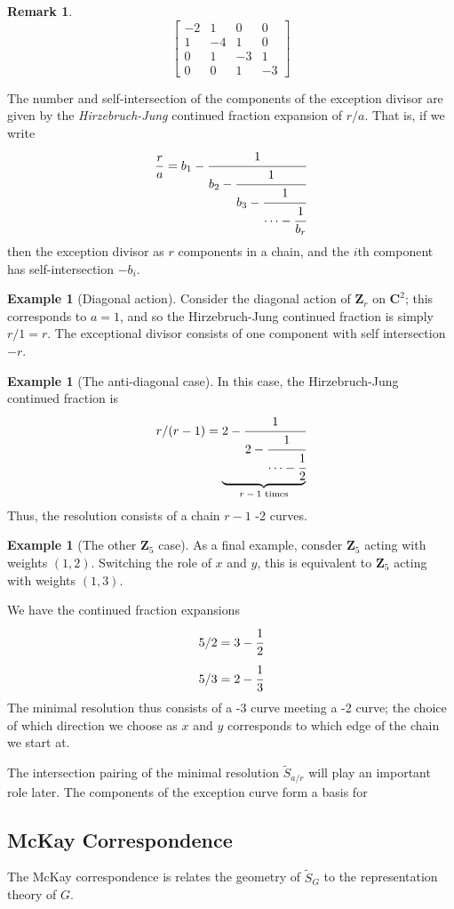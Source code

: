 \documentclass{amsart}[12pt]
\theoremstyle{definition}
\newtheorem{example}[dummy]{Example}
\newtheorem{remark}[dummy]{Remark}
\newcommand{\Z}{\mathbf{Z}}
\newcommand{\C}{\mathbf{C}}
\begin{document}
\begin{remark}
$$
\begin{bmatrix}
-2 & 1 & 0 & 0 \\
1 & -4 & 1 & 0 \\
0 & 1 & -3 & 1 \\
0 & 0 & 1 & -3 
\end{bmatrix}
$$

The number and self-intersection of the components of the exception divisor are given by the \emph{Hirzebruch-Jung} continued fraction expansion of $r/a$.  That is, if we write
$$
\frac{r}{a}=b_1-\cfrac{1}{b_2-\cfrac{1}{b_3-\cfrac{1}{\cdots - \cfrac{1}{b_r}}}}
$$  
then the exception divisor as $r$ components in a chain, and the $i$th component has self-intersection $-b_i$. 

\begin{example}[Diagonal action]
Consider the diagonal action of $\Z_r$ on $\C^2$; this corresponds to $a=1$, and so the Hirzebruch-Jung continued fraction is simply $r/1=r$.  The exceptional divisor consists of one component with self intersection $-r$.

\end{example}


\begin{example}[The anti-diagonal case]  
In this case, the Hirzebruch-Jung continued fraction is
$$r/(r-1)=\underbrace{2-\cfrac{1}{2-\cfrac{1}{\cdots-\cfrac{1}{2}}}}_{\text{$r-1$ times}}$$
Thus, the resolution consists of a chain $r-1$ -2 curves.
\end{example}

\begin{example}[The other $\Z_5$ case]
As a final example, consder $\Z_5$ acting with weights $(1,2)$.  Switching the role of $x$ and $y$, this is equivalent to $\Z_5$ acting with weights $(1,3)$.

We have the continued fraction expansions
$$5/2=3-\cfrac{1}{2}$$
$$5/3=2-\cfrac{1}{3}$$
The minimal resolution thus consists of a -3 curve meeting a -2 curve; the choice of which direction we choose as $x$ and $y$ corresponds to which edge of the chain we start at.
\end{example}

The intersection pairing of the minimal resolution $\widetilde{S}_{a/r}$ will play an important role later.  The components of the exception curve form a basis for 


\subsection{McKay Correspondence}
The McKay correspondence is relates the geometry of $\widetilde{S}_G$ to the representation theory of $G$.


\end{remark}
\end{document}
